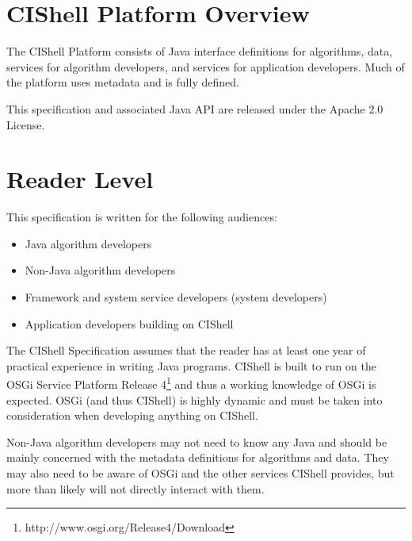 \section{CIShell Platform Overview}

The CIShell Platform consists of Java interface definitions for algorithms, data,
services for algorithm developers, and services for application developers. Much
of the platform uses metadata and is fully defined.

This specification and associated Java API are released under the Apache 2.0
License.



\section{Reader Level}

This specification is written for the following audiences:
\begin{itemize}
  \item Java algorithm developers
  \item Non-Java algorithm developers
  \item Framework and system service developers (system developers)
  \item Application developers building on CIShell
\end{itemize}

The CIShell Specification assumes that the reader has at least one year of
practical experience in writing Java programs. CIShell is built to run on the
OSGi Service Platform Release 4\footnote{http://www.osgi.org/Release4/Download}
and thus a working knowledge of OSGi is expected. OSGi (and thus CIShell) is
highly dynamic and must be taken into consideration when developing anything on
CIShell.

Non-Java algorithm developers may not need to know any Java and should be mainly
concerned with the metadata definitions for algorithms and data. They may also
need to be aware of OSGi and the other services CIShell provides, but more than
likely will not directly interact with them.

